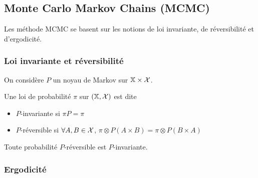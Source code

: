 \documentclass[10pt,a4paper]{article}
\begin{document}
\subsection{Monte Carlo Markov Chains (MCMC)}

Les méthode MCMC se basent sur les notions de loi invariante, de réversibilité et d'ergodicité.

\subsubsection{Loi invariante et réversibilité}

On considère $P$ un noyau de Markov sur $\mathbb{X} \times \mathcal{X}$.
\begin{Def}
	Une loi de probabilité $\pi$ sur $(\mathbb{X}, \mathcal{X})$ est dite
	\begin{itemize}
		\item $P$-invariante si $\pi P = \pi$
		\item $P$-réversible si $\forall A,B \in \mathcal{X}$, $\pi \otimes P (A \times B) = \pi \otimes P (B \times A)$
	\end{itemize}
\end{Def}

\begin{Prop}
	Toute probabilité $P$-réversible est $P$-invariante.
\end{Prop}

\subsubsection{Ergodicité}

\end{document}
